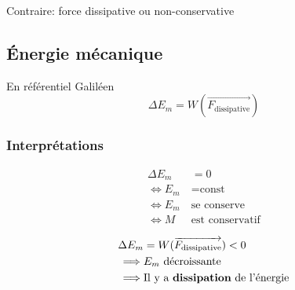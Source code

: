 \documentclass{article}
\renewcommand{\vec}{\overrightarrow}
\begin{document}
Contraire: force dissipative ou non-conservative



\subsection{Énergie mécanique}

En référentiel Galiléen
\[
	\Delta E_m = W(\vec{F_{\text{dissipative}}})
\] 
\subsubsection{Interprétations}

\begin{align*}
	\Delta E_m &= 0 \\
	\iff E_m &= \text{const} \\
	\iff E_m\ &\text{se conserve} \\
	\iff M\ &\text{est conservatif}
\end{align*}

\begin{align*}
	\Delta E_m &= W(\vec{F_{\text{dissipative}}}) < 0 \\
	\implies &E_m\ \text{décroissante} \\
	\implies &\text{Il y a {\bf dissipation} de l'énergie}
\end{align*}
\end{document}
